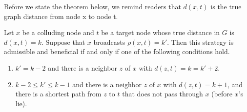 \documentclass{comnet}
\begin{document}
Before we state the theorem below, we remind readers that $d(x,t)$ is the true graph distance from node x to node t.
\begin{theorem} \label{thm:single-agent}

Let $x$ be a colluding node and $t$ be a target node whose true distance in $G$
is $d(x,t) = k$. Suppose that $x$ broadcasts $\rho(x,t) = k'$. Then this
strategy is admissible and beneficial if and only if one of the following
conditions hold.

\begin{enumerate}
   \item $k' = k - 2$ and there is a neighbor $z$ of $x$ with $d(z,t) = k = k'
+ 2$.
   \item $k-2 \leq k' \leq k-1$ and there is a neighbor $z$ of $x$ with $d(z,t)
= k + 1$, and there is a shortest path from $z$ to $t$ that does not pass
through $x$ (before $x$'s lie).
\end{enumerate}

\end{theorem}
\end{document}
